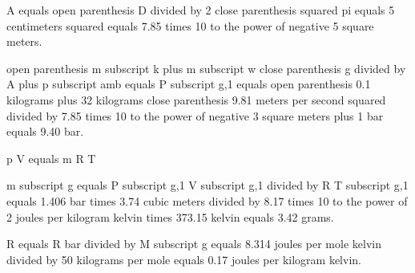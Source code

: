 A equals open parenthesis D divided by 2 close parenthesis squared pi equals 5 centimeters squared equals 7.85 times 10 to the power of negative 5 square meters.

open parenthesis m subscript k plus m subscript w close parenthesis g divided by A plus p subscript amb equals P subscript g,1 equals open parenthesis 0.1 kilograms plus 32 kilograms close parenthesis 9.81 meters per second squared divided by 7.85 times 10 to the power of negative 3 square meters plus 1 bar equals 9.40 bar.

p V equals m R T

m subscript g equals P subscript g,1 V subscript g,1 divided by R T subscript g,1 equals 1.406 bar times 3.74 cubic meters divided by 8.17 times 10 to the power of 2 joules per kilogram kelvin times 373.15 kelvin equals 3.42 grams.

R equals R bar divided by M subscript g equals 8.314 joules per mole kelvin divided by 50 kilograms per mole equals 0.17 joules per kilogram kelvin.